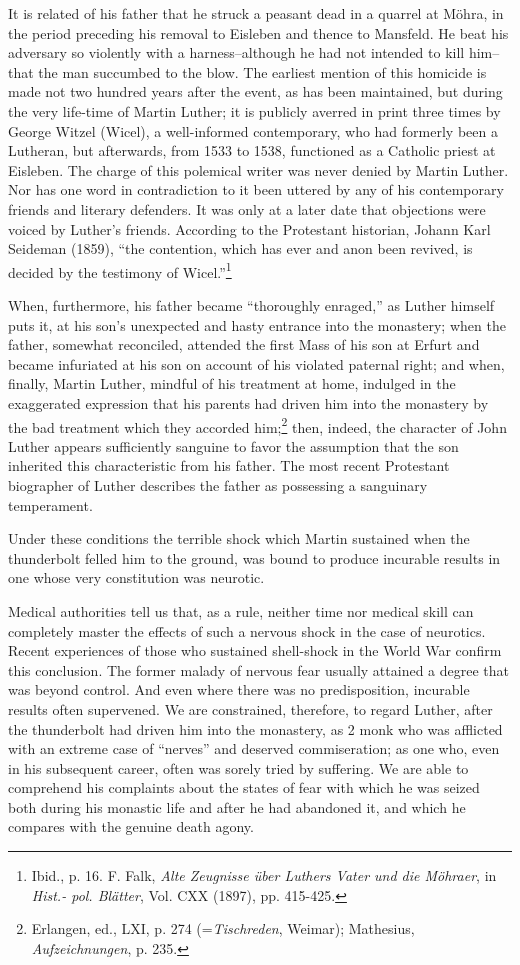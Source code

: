 It is related of his father that he struck a peasant dead in a
quarrel at Möhra, in the period preceding his removal to Eisleben
and thence to Mansfeld. He beat his adversary so violently with
a harness--although he had not intended to kill him--that the
man succumbed to the blow. The earliest mention of this homicide
is made not two hundred years after the event, as has been maintained,
but during the very life-time of Martin Luther; it is publicly averred
in print three times by George Witzel (Wicel), a well-informed
contemporary, who had formerly been a Lutheran, but afterwards,
from 1533 to 1538, functioned as a Catholic priest at Eisleben. The
charge of this polemical writer was never denied by Martin Luther.
Nor has one word in contradiction to it been uttered by any of his
contemporary friends and literary defenders. It was only at a later
date that objections were voiced by Luther’s friends. According to
the Protestant historian, Johann Karl Seideman (1859), “the contention,
which has ever and anon been revived, is decided by the testimony of Wicel.”\footnote
{Ibid., p. 16. F. Falk, \textit{Alte Zeugnisse über Luthers Vater und die Möhraer}, in \textit{Hist.- pol. Blätter}, Vol. CXX (1897), pp. 415-425.}

When, furthermore, his father became “thoroughly enraged,” as
Luther himself puts it, at his son’s unexpected and hasty entrance
into the monastery; when the father, somewhat reconciled, attended
the first Mass of his son at Erfurt and became infuriated at his
son on account of his violated paternal right; and when, finally,
Martin Luther, mindful of his treatment at home, indulged in the
exaggerated expression that his parents had driven him into the
monastery by the bad treatment which they accorded him;\footnote
{Erlangen, ed., LXI, p. 274 (=\textit{Tischreden}, Weimar); Mathesius, \textit{Aufzeichnungen}, p. 235.}
then, indeed, the character of John Luther appears sufficiently sanguine
to favor the assumption that the son inherited this characteristic
from his father. The most recent Protestant biographer of Luther
describes the father as possessing a sanguinary temperament.

Under these conditions the terrible shock which Martin sustained
when the thunderbolt felled him to the ground, was bound to produce
incurable results in one whose very constitution was neurotic.

Medical authorities tell us that, as a rule, neither time nor medical
skill can completely master the effects of such a nervous shock in
the case of neurotics. Recent experiences of those who sustained
shell-shock in the World War confirm this conclusion. The former
malady of nervous fear usually attained a degree that was beyond
control. And even where there was no predisposition, incurable
results often supervened. We are constrained, therefore, to regard
Luther, after the thunderbolt had driven him into the monastery,
as 2 monk who was afflicted with an extreme case of “nerves” and
deserved commiseration; as one who, even in his subsequent career,
often was sorely tried by suffering. We are able to comprehend his
complaints about the states of fear with which he was seized both
during his monastic life and after he had abandoned it, and which
he compares with the genuine death agony.

